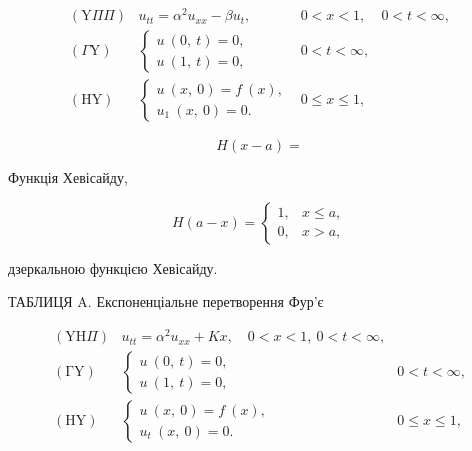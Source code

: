 \documentclass[
  ukrainian,
]{article}
\begin{document}
\[
\begin{aligned} (\mathrm{Y} \Pi \Pi) & u_{tt} = \alpha^2 u_{xx} - \beta u_t, & 0 < x < 1, & 0 < t < \infty, \\ (\Gamma \mathrm{Y}) & \begin{cases} u \ (0, \ t) = 0, \\ u \ (1, \ t) = 0, \end{cases} & 0 < t < \infty, \\ (\mathrm{H} \mathrm{Y}) & \begin{cases} u \ (x, \ 0) = f \ (x), \\ u_1 \ (x, \ 0) = 0. \end{cases} & 0 \leqslant x \leqslant 1, \end{aligned}
\]

\[
H(x-a) =
\]

Функція Хевісайду,

\[
H(a-x) = \begin{cases} 1, & x \leqslant a, \\ 0, & x > a, \end{cases}
\]

дзеркальною функцією Хевісайду.

ТАБЛИЦЯ A. Експоненціальне перетворення Фур'є

\[
\begin{aligned} (\mathrm{Y} \mathrm{H} \Pi) & u_{tt} = \alpha^2 u_{xx} + Kx, \quad 0 < x < 1, \ 0 < t < \infty, \\ (\mathrm{\Gamma} \mathrm{Y}) & \begin{cases} u \ (0, \ t) = 0, \\ u \ (1, \ t) = 0, \end{cases} & 0 < t < \infty, \\ (\mathrm{H} \mathrm{Y}) & \begin{cases} u \ (x, \ 0) = f \ (x), \\ u_t \ (x, \ 0) = 0. \end{cases} & 0 \leqslant x \leqslant 1, \end{aligned}
\]
\end{document}
